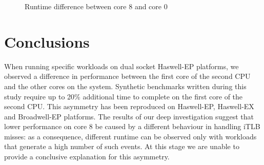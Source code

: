 \documentclass[a4paper]{jpconf}
\begin{document}

\begin{figure}
\begin{center}
\caption{Runtime difference between core 8 and core 0}
\end{center}
\end{figure}

\section{Conclusions}
When running specific workloads on dual socket Haswell-EP platforms, we observed a 
difference in performance between the first core of the second CPU and the other 
cores on the system. Synthetic benchmarks written during this study require up to 20\% additional 
time to complete on the first core of the second CPU. This asymmetry has been 
reproduced on Haswell-EP, Haswell-EX and Broadwell-EP platforms. The results of
our deep investigation suggest that lower performance on core 8 be caused
by a different behaviour in handling iTLB misses: as a consequence, different
runtime can be observed only with workloads that generate a high number of
such events. At this stage we are unable to provide a conclusive explanation for
this asymmetry.
\end{document}
